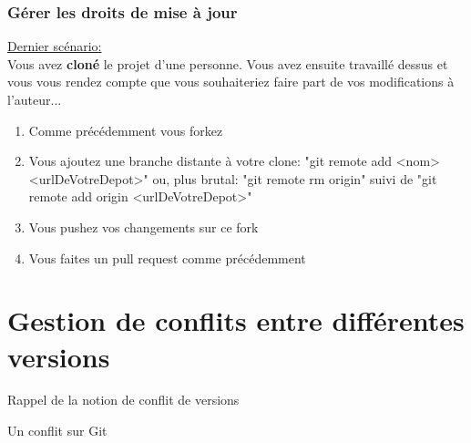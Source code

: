 \documentclass{beamer}
\begin{document}
\begin{frame}
\frametitle{Gérer les droits de mise à jour}

\underline{Dernier scénario:}\\
\smallskip
Vous avez \textbf{cloné} le projet d'une personne. Vous avez ensuite travaillé dessus et vous vous rendez compte que vous souhaiteriez faire part de vos modifications à l'auteur...\\
\medskip

\begin{enumerate}
    \item Comme précédemment vous forkez
    \item Vous ajoutez une branche distante à votre clone: "git remote add <nom> <urlDeVotreDepot>" ou, plus brutal: "git remote rm origin" suivi de "git remote add origin <urlDeVotreDepot>"
    \item Vous pushez vos changements sur ce fork
    \item Vous faites un pull request comme précédemment
\end{enumerate}
\end{frame}


\section{Gestion de conflits entre différentes versions}
\begin{frame}{Rappel de la notion de conflit de versions}
    
\end{frame}

\begin{frame}{Un conflit sur Git}
    
\end{frame}
\end{document}
